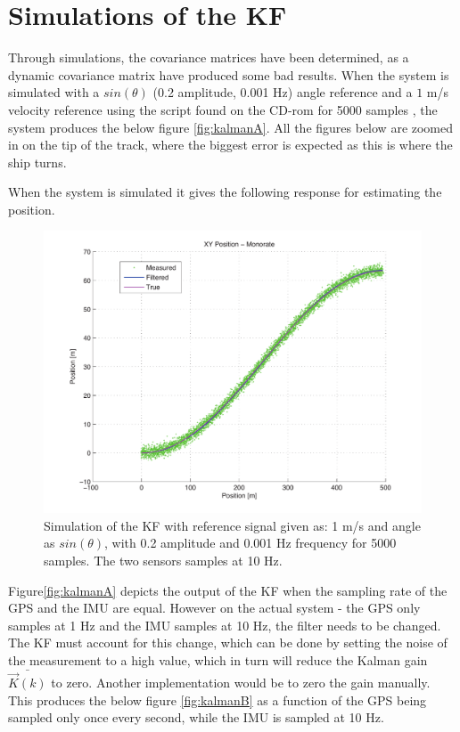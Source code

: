 \section{Simulations of the \ac{KF}}
Through simulations, the covariance matrices have been determined, as a dynamic covariance matrix have produced some bad results. When the system is simulated with a $sin(\theta)$ (0.2 amplitude, 0.001 Hz) angle reference and a $1$ m/s velocity reference using the \MATLAB  script found on the CD-rom for 5000 samples , the system produces the below figure \vref{fig:kalmanA}. All the figures below are zoomed in on the tip of the track, where the biggest error is expected as this is where the ship turns. 


When the system is simulated it gives the following response for estimating the position.
\begin{figure}[htbp]
	\centering
	\includegraphics[width=\textwidth]{img/kalmana}
	\caption{Simulation of the \ac{KF} with reference signal given as: 1 m/s and angle as $sin(\theta)$, with 0.2 amplitude and 0.001 Hz frequency for 5000 samples. The two sensors samples at 10 Hz.}
	\label{fig:kalmanA}
\end{figure}

Figure\vref{fig:kalmanA} depicts the output of the \ac{KF} when the sampling rate of the \ac{GPS} and the \ac{IMU} are equal. However on the actual system - the \ac{GPS} only samples at 1 Hz and the \ac{IMU} samples at 10 Hz, the filter needs to be changed. The \ac{KF} must account for this change, which can be done by setting the noise of the measurement to a high value, which in turn will reduce the Kalman gain $\bar{\vec{K}(k)}$ to zero. Another implementation would be to zero the gain manually. This produces the below figure \vref{fig:kalmanB} as a function of the \ac{GPS} being sampled only once every second, while the \ac{IMU} is sampled at 10 Hz. 

